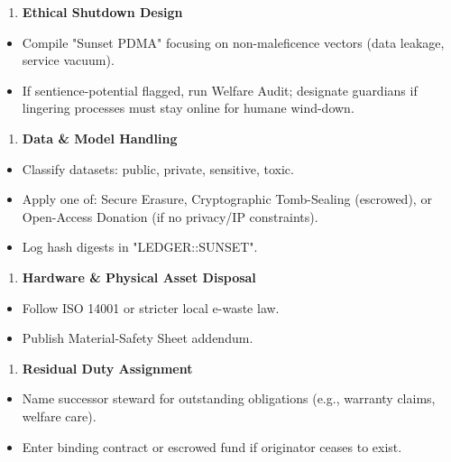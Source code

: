 \documentclass[11pt]{article}
\begin{document}
\begin{enumerate}\setlength\itemsep{0pt}
\item \textbf{Ethical Shutdown Design}
\end{enumerate}

\begin{itemize}\setlength\itemsep{0pt}
\item Compile "Sunset PDMA" focusing on non-maleficence vectors (data leakage, service vacuum).
\item If sentience-potential flagged, run Welfare Audit; designate guardians if lingering processes must stay online for humane wind-down.
\end{itemize}

\begin{enumerate}\setlength\itemsep{0pt}
\item \textbf{Data \& Model Handling}
\end{enumerate}

\begin{itemize}\setlength\itemsep{0pt}
\item Classify datasets: public, private, sensitive, toxic.
\item Apply one of: Secure Erasure, Cryptographic Tomb-Sealing (escrowed), or Open-Access Donation (if no privacy/IP constraints).
\item Log hash digests in "LEDGER::SUNSET".
\end{itemize}

\begin{enumerate}\setlength\itemsep{0pt}
\item \textbf{Hardware \& Physical Asset Disposal}
\end{enumerate}

\begin{itemize}\setlength\itemsep{0pt}
\item Follow ISO 14001 or stricter local e-waste law.
\item Publish Material-Safety Sheet addendum.
\end{itemize}

\begin{enumerate}\setlength\itemsep{0pt}
\item \textbf{Residual Duty Assignment}
\end{enumerate}

\begin{itemize}\setlength\itemsep{0pt}
\item Name successor steward for outstanding obligations (e.g., warranty claims, welfare care).
\item Enter binding contract or escrowed fund if originator ceases to exist.
\end{itemize}
\end{document}
